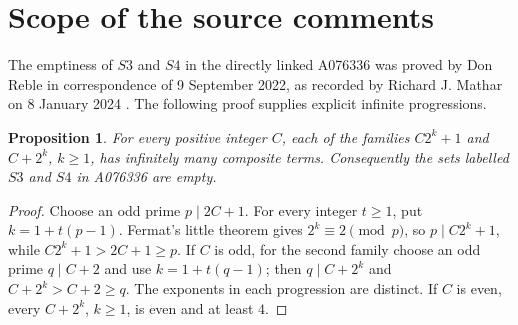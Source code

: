 \documentclass[11pt]{article}
\newtheorem{proposition}[theorem]{Proposition}
\begin{document}
\section{Scope of the source comments}
The emptiness of $S3$ and $S4$ in the directly linked A076336 was
proved by Don Reble in correspondence of 9 September 2022, as recorded
by Richard J. Mathar on 8 January 2024 \cite{reble,sierpinski}.
The following proof supplies explicit infinite progressions.
\begin{proposition}\label{prop:families}
For every positive integer $C$, each of the families
$C2^k+1$ and $C+2^k$, $k\geq1$, has infinitely many composite terms.
Consequently the sets labelled $S3$ and $S4$ in A076336 are empty.
\end{proposition}
\begin{proof}
Choose an odd prime $p\mid2C+1$. For every integer $t\geq1$, put
$k=1+t(p-1)$. Fermat's little theorem gives $2^k\equiv2\pmod p$,
so $p\mid C2^k+1$, while $C2^k+1>2C+1\geq p$.
If $C$ is odd, for the second family choose an odd prime $q\mid C+2$ and use
$k=1+t(q-1)$; then $q\mid C+2^k$ and $C+2^k>C+2\geq q$.
The exponents in each progression are distinct.
If $C$ is even, every $C+2^k$, $k\geq1$, is even and at least $4$.
\end{proof}
\end{document}
